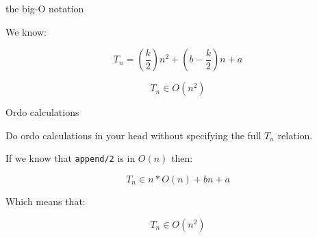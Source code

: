 \begin{frame}[fragile]{the big-O notation}

  We know:

  \vspace{10pt}\pause

  $$T_n  = (\frac{k}{2})n^2 + (b -\frac{k}{2})n+ a $$

  \vspace{20pt}\pause

  $$T_n \in O(n^2)$$
  
\end{frame}

\begin{frame}{Ordo calculations}

  Do ordo calculations in your head without specifying the full $T_n$
  relation. \pause

  \vspace{10pt}If we know that {\tt append/2} is in $O(n)$ then: \pause
  
  $$ T_n \in n * O(n) + bn + a$$ 

  \vspace{10pt}Which means that:

  $$ T_n \in O(n^2)$$

\end{frame}



